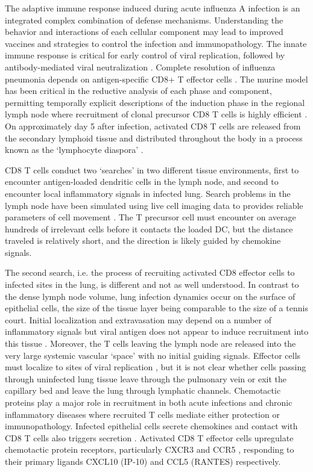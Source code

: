 \documentclass[10pt]{article}
\begin{document}
The adaptive immune response induced during acute influenza A infection is an integrated complex combination of defense mechanisms.  Understanding the behavior and interactions of each cellular component may lead to improved vaccines and strategies to control the infection and immunopathology.   The innate immune response is critical for early control of viral replication, followed by antibody-mediated viral neutralization \cite{Kohlmeier2009a, Joo2008, Oslund2011}.   Complete resolution of influenza pneumonia depends on antigen-specific CD8+ T effector cells \cite{Cerwenka1999, Kim2011}.  The murine model has been critical in the reductive analysis of each phase and component, permitting temporally explicit descriptions of the induction phase in the regional lymph node \cite{Miller2003, Allan2006, Ingulli2009} where recruitment of clonal precursor CD8 T cells is highly efficient \cite{VanHeijst2009}.   On approximately day 5 after infection, activated CD8 T cells are released from the secondary lymphoid tissue \cite{Miao2010a} and distributed throughout the body in a process known as the ‘lymphocyte diaspora’ \cite{Marshall2001}.

CD8 T cells conduct two `searches' in two different tissue environments, first to encounter antigen-loaded dendritic cells in the lymph node, and second to encounter local inflammatory signals in infected lung.  Search problems in the lymph node have been simulated using live cell imaging data to provides reliable parameters of cell movement \cite{Vroomans2012}.  The T precursor cell must encounter on average hundreds of irrelevant cells before it contacts the loaded DC, but the distance traveled is relatively short, and the direction is likely guided by chemokine signals.  

The second search, i.e. the process of recruiting activated CD8 effector cells to infected sites in the lung,  is different and not as well understood.  In contrast to the dense lymph node volume, lung infection dynamics occur on the surface of epithelial cells, the size of the tissue layer being comparable to the size of a tennis court.  Initial localization and extravasation may depend on a number of inflammatory signals but viral antigen does not appear to induce recruitment into this tissue \cite{Topham2001}.   Moreover, the T cells leaving the lymph node are released into the very large systemic vascular `space' with no initial guiding signals.  Effector cells must localize to sites of viral replication \cite{Cerwenka1999}, but it is not clear whether cells passing through uninfected lung tissue leave through the pulmonary vein or exit the capillary bed and leave the lung through lymphatic channels. Chemotactic proteins play a major role in recruitment in both acute infections and chronic inflammatory diseases \cite{Bromley2008, Medoff2005, Castellino2006 ,Gunn1998, Okada2005} where recruited T cells mediate either protection or immunopathology.  Infected epithelial cells secrete chemokines \cite{Chan2005} and contact with CD8 T cells also triggers secretion \cite{Zhao2000}. Activated CD8 T effector cells upregulate chemotactic protein receptors, particularly CXCR3 and CCR5 \cite{Hoji2005, Groom2011a}, responding to their primary ligands CXCL10 (IP-10) and CCL5 (RANTES) respectively.  
\end{document}
